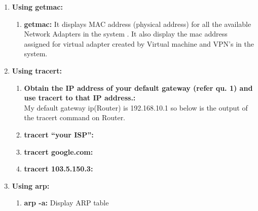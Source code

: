 \documentclass[a4paper,12pt]{article}
\begin{document}
\begin{enumerate}
    \item \textbf{Using getmac:}
          \begin{enumerate}
              \item \textbf{getmac:}
                    It displays MAC address (physical address) for all the available Network Adapters in the system .
                    It also display the mac address assigned for virtual adapter created by Virtual machine and VPN's in the system.



          \end{enumerate}

    \item \textbf{Using tracert:}
          \begin{enumerate}
              \item \textbf{Obtain the IP address of your default gateway (refer qu. 1) and use tracert to that IP
                        address.:} \\
                    My default gateway ip(Router)  is 192.168.10.1 so below is the output of the tracert command on Router.


              \item \textbf{tracert “your ISP”:}

              \item \textbf{tracert google.com:}

              \item \textbf{tracert 103.5.150.3:}



          \end{enumerate}

    \item \textbf{Using arp:}
          \begin{enumerate}
              \item \textbf{arp -a:} Display ARP table




\end{enumerate}
\end{enumerate}
\end{document}
